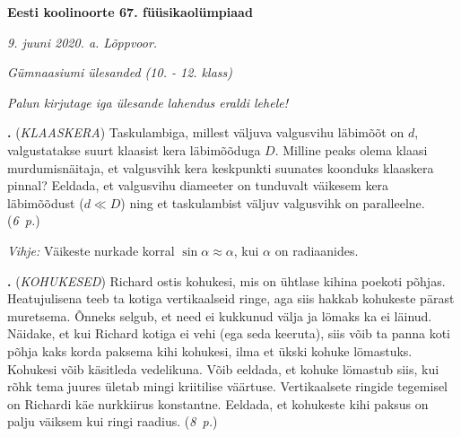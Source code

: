 \documentclass[11pt,a5paper]{article}
\newcommand{\numb}[1]{\vspace{5pt}\textbf{\large #1}}
\newcommand{\nimi}[1]{(\textsl{\small #1})}
\newcommand{\punktid}[1]{(\emph{#1~p.})}
\newcounter{ylesanne}
\newcommand{\yl}[1]{\addtocounter{ylesanne}{1}\numb{\theylesanne.} \nimi{#1} \newblock{}}
\begin{document}
\begin{center}
\textbf{\Large Eesti koolinoorte 67. füüsikaolümpiaad} \vspace{3pt}

\emph{9. juuni 2020. a. Lõppvoor.}

\emph{Gümnaasiumi ülesanded (10. - 12. klass)}

\emph{Palun kirjutage iga ülesande lahendus eraldi lehele!}

\end{center}

\yl{KLAASKERA}
Taskulambiga, millest väljuva valgusvihu läbimõõt on $d$, valgustatakse suurt
klaasist kera läbimõõduga $D$. Milline peaks olema klaasi murdumisnäitaja, et
valgusvihk kera keskpunkti suunates koonduks klaaskera pinnal? Eeldada, et
valgusvihu diameeter on tunduvalt väikesem kera läbimõõdust ($d\ll D$) ning et
taskulambist väljuv valgusvihk on paralleelne.
\punktid{6}

\emph{Vihje:} Väikeste nurkade korral $\sin \alpha \approx \alpha$, kui $\alpha$
on radiaanides.

\yl{KOHUKESED}
Richard ostis kohukesi, mis on ühtlase kihina poekoti põhjas. Heatujulisena teeb
ta kotiga vertikaalseid ringe, aga siis hakkab kohukeste pärast muretsema. Õnneks
selgub, et need ei kukkunud välja ja lömaks ka ei läinud. Näidake, et kui Richard
kotiga ei vehi (ega seda keeruta), siis võib ta panna koti põhja kaks korda
paksema kihi kohukesi, ilma et ükski kohuke lömastuks. Kohukesi võib käsitleda
vedelikuna. Võib eeldada, et kohuke lömastub siis, kui rõhk tema juures ületab
mingi kriitilise väärtuse. Vertikaalsete ringide tegemisel on Richardi käe
nurkkiirus konstantne. Eeldada, et kohukeste kihi paksus on palju väiksem kui
ringi raadius.
\punktid{8}
\end{document}
